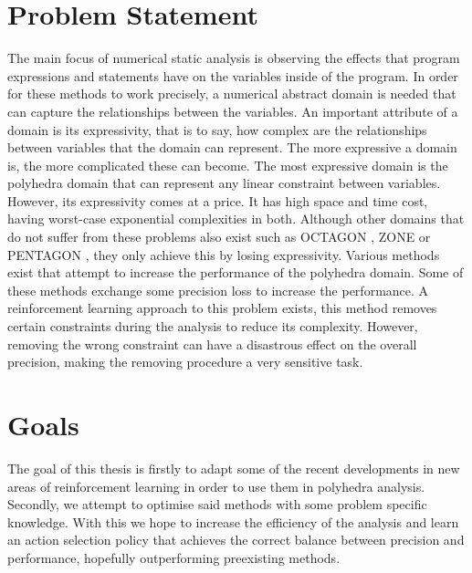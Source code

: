 \section{Problem Statement}
The main focus of numerical static analysis is observing the effects that program expressions and statements have on the variables inside of the program. In order for these methods to work precisely, a numerical abstract domain is needed that can capture the relationships between the variables. An important attribute of a domain is its expressivity, that is to say, how complex are the relationships between variables that the domain can represent. The more expressive a domain is, the more complicated these can become. The most expressive domain is the polyhedra domain that can represent any linear constraint between variables. However, its expressivity comes at a price. It has high space and time cost, having worst-case exponential complexities in both. Although other domains that do not suffer from these problems also exist such as OCTAGON \cite{mine2006octagon}, ZONE \cite{mine2001new} or PENTAGON \cite{logozzo2010pentagons}, they only achieve this by losing expressivity. Various methods exist that attempt to increase the performance of the polyhedra domain. Some of these methods exchange some precision loss to increase the performance. A reinforcement learning approach to this problem exists, this method removes certain constraints during the analysis to reduce its complexity.  However, removing the wrong constraint can have a disastrous effect on the overall precision, making the removing procedure a very sensitive task.
\section{Goals}
The goal of this thesis is firstly to adapt some of the recent developments in new areas of reinforcement learning in order to use them in polyhedra analysis. Secondly, we attempt to optimise said methods with some problem specific knowledge. With this we hope to increase the efficiency of the analysis and learn an action selection policy that achieves the correct balance between precision and performance, hopefully outperforming preexisting methods. 
